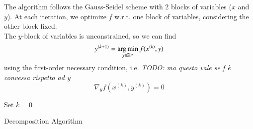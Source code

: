 The algorithm follows the Gauss-Seidel scheme with 2 blocks of variables ($x$ and $y$). At each iteration, we optimize $f$ w.r.t. one block of variables, considering the other block fixed. \\
The $y$-block of variables is unconstrained, so we can find
\begin{equation}\label{eq:updatey}
y^{(k+1)} = \operatorname*{arg\,min}_{y \in \mathbb{R}^m} f(x^{(k)},y)
\end{equation}
using the first-order necessary condition, i.e. \textit{TODO: ma questo vale se f è convessa rispetto ad y}
\begin{equation}
\nabla_y f(x^{(k)}, y^{(k)}) = 0
\end{equation}

\begin{algorithm}
 Set $k = 0$\\
 \caption{Decomposition Algorithm}
\end{algorithm}

